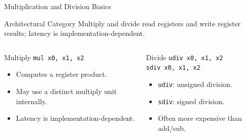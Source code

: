 \documentclass[aspectratio=169,11pt,t]{beamer}
\newcommand{\code}[1]{\texttt{#1}}
\begin{document}
\begin{frame}{Multiplication and Division Basics}
\begin{block}{Architectural Category}
Multiply and divide read registers and write register results; latency is implementation-dependent.
\end{block}
\vspace{0.2cm}
\begin{columns}[T,onlytextwidth]
\begin{block}{Multiply}
\large
\hspace{1.5cm}\code{mul x0, x1, x2}
\normalsize
\begin{itemize}
\item Computes a register product.
\item May use a distinct multiply unit internally.
\item Latency is implementation-dependent.
\end{itemize}
\end{block}
\begin{block}{Divide}
\large
\hspace{1.5cm}\code{udiv x0, x1, x2}\\[0.10cm]
\hspace{1.5cm}\code{sdiv x0, x1, x2}
\normalsize
\begin{itemize}
\item \code{udiv}: unsigned division.
\item \code{sdiv}: signed division.
\item Often more expensive than add/sub.
\end{itemize}
\end{block}
\end{columns}
\end{frame}










\end{document}
